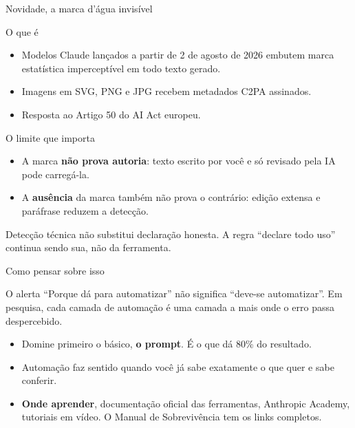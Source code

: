 \documentclass[11pt,aspectratio=169,t]{beamer}
\begin{document}
\begin{frame}{Novidade, a marca d'água invisível}
  \small
  \begin{block}{O que é}
    \begin{itemize}
      \item Modelos Claude lançados a partir de 2 de agosto de 2026 embutem marca estatística imperceptível em todo texto gerado.
      \item Imagens em SVG, PNG e JPG recebem metadados C2PA assinados.
      \item Resposta ao Artigo 50 do AI Act europeu.
    \end{itemize}
  \end{block}
  \pause
  \vspace{0.1cm}
  \begin{alertblock}{O limite que importa}
    \begin{itemize}
      \item A marca \textbf{não prova autoria}: texto escrito por você e só revisado pela IA pode carregá-la.
      \item A \textbf{ausência} da marca também não prova o contrário: edição extensa e paráfrase reduzem a detecção.
    \end{itemize}
  \end{alertblock}
  \pause
  \centering Detecção técnica não substitui declaração honesta. A regra ``declare todo uso'' continua sendo sua, não da ferramenta.
\end{frame}

\begin{frame}{Como pensar sobre isso}
  \begin{alertblock}{O alerta}
    ``Porque dá para automatizar'' não significa ``deve-se automatizar''. Em pesquisa, cada camada de automação é uma camada a mais onde o erro passa despercebido.
  \end{alertblock}
  \pause
  \vfill
  \begin{itemize}
    \item Domine primeiro o básico, \textbf{o prompt}. É o que dá 80\% do resultado.
    \item Automação faz sentido quando você já sabe exatamente o que quer e sabe conferir.
    \pause
    \item \textbf{Onde aprender}, documentação oficial das ferramentas, Anthropic Academy, tutoriais em vídeo. O Manual de Sobrevivência tem os links completos.
  \end{itemize}
\end{frame}
\end{document}
